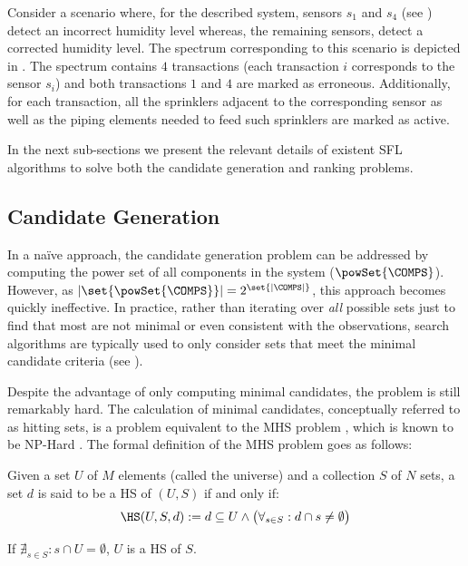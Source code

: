 Consider a scenario where, for the described system, sensors $s_1$ and
$s_4$ (see ) detect an incorrect
humidity level whereas, the remaining sensors, detect a corrected
humidity level.
%
The spectrum corresponding to this scenario is depicted in
.
%
The spectrum contains $4$ transactions (each transaction $i$
corresponds to the sensor $s_i$) and both transactions $1$ and $4$ are
marked as erroneous.
%
Additionally, for each transaction, all the sprinklers adjacent to the
corresponding sensor as well as the piping elements needed to feed
such sprinklers are marked as active.



In the next sub-sections we present the relevant details of existent
\ac{SFL} algorithms to solve both the candidate generation and ranking
problems.


\subsection{Candidate Generation}
\label{sec:intro:candidate-generation}
In a na\"{i}ve approach, the candidate generation problem can be
addressed by computing the power set of all components in the system
($\powSet{\COMPS}$).
%
However, as $|\set{\powSet{\COMPS}}| = 2^{\set{|\COMPS|}}$, this
approach becomes quickly ineffective.
%
In practice, rather than iterating over \emph{all} possible sets just
to find that most are not minimal or even consistent with the
observations, search algorithms are typically used to only consider
sets that meet the minimal candidate criteria (see
).
%

Despite the advantage of only computing minimal candidates, the
problem is still remarkably hard.
%
The calculation of minimal candidates, conceptually referred to as
hitting sets, is a problem equivalent to the \acl{MHS} problem
\cite{Reiter87}, which is known to be NP-Hard \cite{Garey90}.
%
The formal definition of the \acl{MHS} problem goes as follows:

\begin{definition}
  \label{def:intro:hitting-set}
  Given a set $U$ of $M$ elements (called the universe) and a
  collection $S$ of $N$ sets, a set $d$ is said to be a \acf{HS} of
  $(U,S)$ if and only if:
  \begin{equation}
    \label{eq:intro:hitting-set}
    \displaystyle \HS(U,S,d):= d \subseteq U \wedge \big(\forall_{s \in S}: d \cap s \not = \emptyset\big)
  \end{equation}
\end{definition}
\begin{corollary}
  If $\nexists_{s \in S} : s \cap U = \emptyset$, $U$ is a \ac{HS} of $S$.
\end{corollary}

